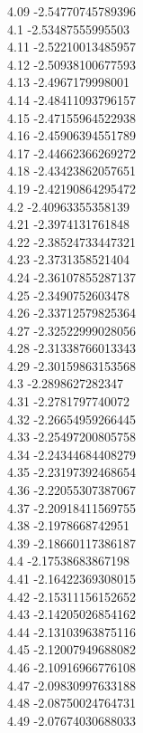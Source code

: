 {4.09	-2.54770745789396\\
4.1	-2.53487555995503\\
4.11	-2.52210013485957\\
4.12	-2.50938100677593\\
4.13	-2.4967179998001\\
4.14	-2.48411093796157\\
4.15	-2.47155964522938\\
4.16	-2.45906394551789\\
4.17	-2.44662366269272\\
4.18	-2.43423862057651\\
4.19	-2.42190864295472\\
4.2	-2.40963355358139\\
4.21	-2.3974131761848\\
4.22	-2.38524733447321\\
4.23	-2.3731358521404\\
4.24	-2.36107855287137\\
4.25	-2.3490752603478\\
4.26	-2.33712579825364\\
4.27	-2.32522999028056\\
4.28	-2.31338766013343\\
4.29	-2.30159863153568\\
4.3	-2.2898627282347\\
4.31	-2.2781797740072\\
4.32	-2.26654959266445\\
4.33	-2.25497200805758\\
4.34	-2.24344684408279\\
4.35	-2.23197392468654\\
4.36	-2.22055307387067\\
4.37	-2.20918411569755\\
4.38	-2.1978668742951\\
4.39	-2.18660117386187\\
4.4	-2.17538683867198\\
4.41	-2.16422369308015\\
4.42	-2.15311156152652\\
4.43	-2.14205026854162\\
4.44	-2.13103963875116\\
4.45	-2.12007949688082\\
4.46	-2.10916966776108\\
4.47	-2.09830997633188\\
4.48	-2.08750024764731\\
4.49	-2.07674030688033\\
}
